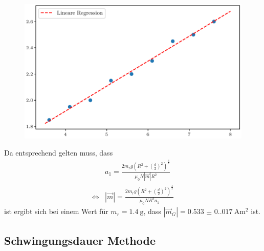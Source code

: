 \begin{figure}[H]
    \centering
    \includegraphics{plot1.pdf}
    \label{fig:grav}
\end{figure}
Da entsprechend gelten muss, dass
\begin{align}
    & a_1=\frac{2m_rg\left(R^2+\left(\frac{d}{2}\right)^2\right)^\frac{3}{2}}{\mu_0N|\vec{m}|R^2} \\
    \iff & |\vec{m}|=\frac{2m_rg\left(R^2+\left(\frac{d}{2}\right)^2\right)^\frac{3}{2}}{\mu_0NR^2a_1}
\end{align}
ist ergibt sich bei einem Wert für $m_r=\qty{1.4}{\gram}$, dass $|\vec{m}_G|=\qty{0.533(0.017)}{\ampere\meter\squared}$ ist.

\subsection{Schwingungsdauer Methode}

